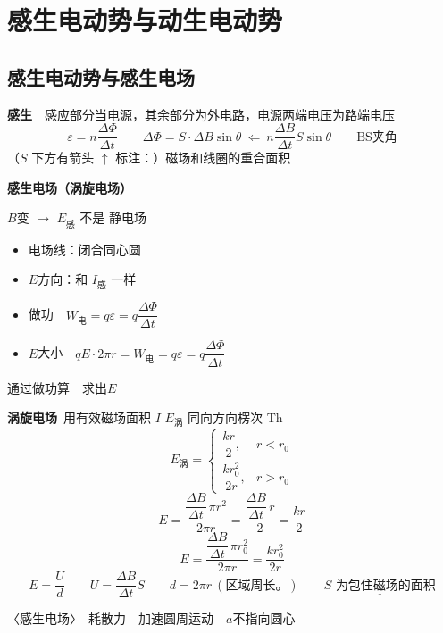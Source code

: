 \section{感生电动势与动生电动势}
\subsection{感生电动势与感生电场}
\textbf{感生}　感应部分当电源，其余部分为外电路，电源两端电压为路端电压
\[
\varepsilon=n\frac{\Delta\Phi}{\Delta t}\qquad
\Delta\Phi=S\cdot\Delta B\sin\theta\ \Leftarrow\ n\frac{\Delta B}{\Delta t}S\sin\theta\qquad
\text{BS夹角}
\]
（$S$ 下方有箭头 $\uparrow$ 标注：）磁场和线圈的重合面积

\textbf{感生电场（涡旋电场）}

$B$变 $\to$ $E_{\text{感}}$ 不是 静电场
\begin{itemize}
  \item 电场线：闭合同心圆
  \item $E$方向：和 $I_{\text{感}}$ 一样
  \item 做功　$W_{\text{电}}=q\varepsilon=q\dfrac{\Delta\Phi}{\Delta t}$
  \item $E$大小　$qE\cdot2\pi r=W_{\text{电}}=q\varepsilon=q\dfrac{\Delta\Phi}{\Delta t}$
\end{itemize}
通过做功算　求出$E$

\textbf{涡旋电场}\quad {}\ 用有效磁场面积 %
$I$ $E_{\text{涡}}$ 同向\quad 方向楞次 Th
\[ E_{\text{涡}}=\left\{\begin{array}{ll}\dfrac{kr}{2}, & r<r_0\\[2ex] \dfrac{kr_0^2}{2r}, & r>r_0\end{array}\right. \]
\[ E=\frac{\dfrac{\Delta B}{\Delta t}\,\pi r^2}{2\pi r}=\frac{\dfrac{\Delta B}{\Delta t}\,r}{2}=\frac{kr}{2} \]
\[ E=\frac{\dfrac{\Delta B}{\Delta t}\,\pi r_0^2}{2\pi r}=\frac{kr_0^2}{2r} \]
\[ E=\frac{U}{d}\qquad U=\frac{\Delta B}{\Delta t}S\qquad d=2\pi r\ (\text{区域周长。})\qquad \underline{S\text{ 为包住磁场的面积}} \]

\noindent 〈感生电场〉　耗散力　加速圆周运动　$a$不指向圆心

